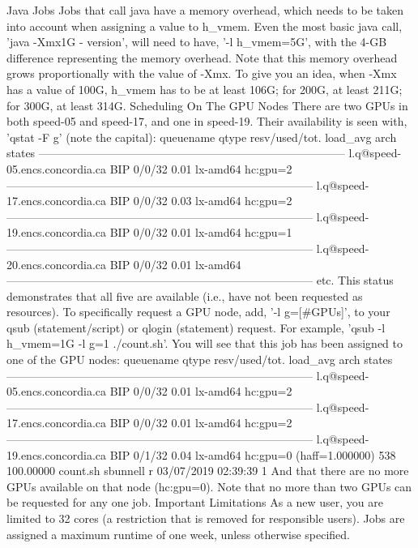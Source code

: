 Java Jobs 
Jobs that call java have a memory overhead, which needs to be taken into account  when assigning a value to h_vmem. Even the most basic java call, 'java -Xmx1G - version', will need to have, '-l h_vmem=5G', with the 4-GB difference representing the  memory overhead. Note that this memory overhead grows proportionally with the  value of -Xmx. To give you an idea, when -Xmx has a value of 100G, h_vmem has to  be at least 106G; for 200G, at least 211G; for 300G, at least 314G. 
Scheduling On The GPU Nodes 
There are two GPUs in both speed-05 and speed-17, and one in speed-19. Their  availability is seen with, 'qstat -F g' (note the capital): 
queuename qtype resv/used/tot. load_avg arch states ---------------------------------------------------------------------------------
l.q@speed-05.encs.concordia.ca BIP 0/0/32 0.01 lx-amd64  hc:gpu=2 
--------------------------------------------------------------------------------- 
l.q@speed-17.encs.concordia.ca BIP 0/0/32 0.03 lx-amd64  hc:gpu=2 
--------------------------------------------------------------------------------- 
l.q@speed-19.encs.concordia.ca BIP 0/0/32 0.01 lx-amd64  hc:gpu=1 
--------------------------------------------------------------------------------- 
l.q@speed-20.encs.concordia.ca BIP 0/0/32 0.01 lx-amd64  --------------------------------------------------------------------------------- 
etc. 
This status demonstrates that all five are available (i.e., have not been requested as  resources). To specifically request a GPU node, add, '-l g=[#GPUs]', to your qsub  (statement/script) or qlogin (statement) request. For example, 'qsub -l h_vmem=1G -l  g=1 ./count.sh'. You will see that this job has been assigned to one of the GPU nodes: queuename qtype resv/used/tot. load_avg arch states --------------------------------------------------------------------------------- 
l.q@speed-05.encs.concordia.ca BIP 0/0/32 0.01 lx-amd64  hc:gpu=2 
--------------------------------------------------------------------------------- 
l.q@speed-17.encs.concordia.ca BIP 0/0/32 0.01 lx-amd64  hc:gpu=2 
--------------------------------------------------------------------------------- 
l.q@speed-19.encs.concordia.ca BIP 0/1/32 0.04 lx-amd64  hc:gpu=0 (haff=1.000000) 
 538 100.00000 count.sh sbunnell r 03/07/2019 02:39:39 1  And that there are no more GPUs available on that node (hc:gpu=0). Note that no 
more than two GPUs can be requested for any one job. 
Important Limitations 
As a new user, you are limited to 32 cores (a restriction that is removed for responsible  users). 
Jobs are assigned a maximum runtime of one week, unless otherwise specified. 

